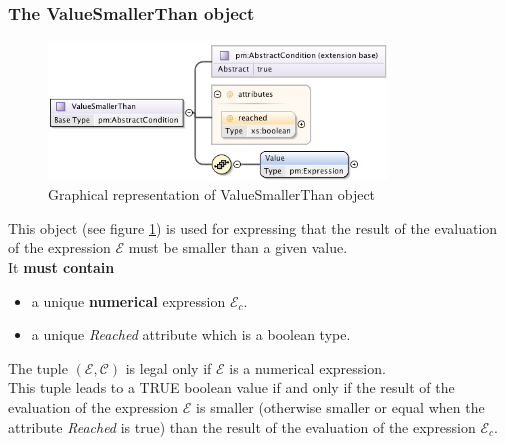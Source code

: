 \documentclass[a4paper,11pt] {ivoa}
\begin{document}
\subsubsection{The ValueSmallerThan object}
\begin{figure}[htbp]
\begin{center}
\includegraphics[width=0.8\textwidth]{pictures/ValueSmallerThan.jpg} 
\caption{Graphical representation of ValueSmallerThan object}
\label{Pic-ValueSmallerThan}
\end{center}
\end{figure}
This object (see figure \ref{Pic-ValueSmallerThan}) is used for expressing that the result of the
evaluation of the expression $\mathcal E$ must be smaller than a given value.\\
It {\bf must contain}
\begin{itemize}
\item a unique {\bf numerical} expression $\mathcal E_c$. 
\item a unique {\it Reached} attribute which is a boolean type.
\end{itemize}
The tuple $(\mathcal E, \mathcal C)$ is legal only if $\mathcal E$ is a numerical expression.\\
This tuple leads to a TRUE boolean value if and only if the result of the evaluation of the
expression $\mathcal E$ is smaller (otherwise smaller or equal when the  attribute {\it Reached} is
true) than the result of the evaluation of the expression $\mathcal E_c$.
\end{document}
